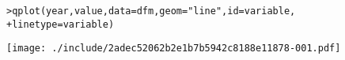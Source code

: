\begin{alltt}
> qplot(year, value, data = dfm, geom = "line", id = variable, 
+     linetype = variable)
\end{alltt}
\texttt{[image: ./include/2adec52062b2e1b7b5942c8188e11878-001.pdf]}
\begin{alltt}

\end{alltt}

% 
% 
% 
% 
% 
% 
% 
% 
% 
% 
